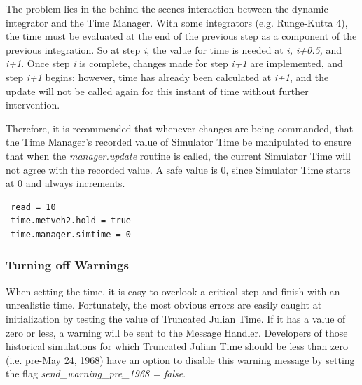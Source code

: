 The problem lies in the behind-the-scenes interaction between the dynamic integrator and the Time Manager.  With some integrators (e.g. Runge-Kutta 4), the time must be evaluated at the end of the previous step as a component of the previous integration.  So at step \textit{i}, the value for time is needed at \textit{i, i+0.5,} and \textit{i+1}.  Once step \textit{i} is complete, changes made for step \textit{i+1} are implemented, and step \textit{i+1} begins; however, time has already been calculated at \textit{i+1}, and the update will not be called again for this instant of time without further intervention.

Therefore, it is recommended that whenever changes are being commanded, that the Time Manager's recorded value of Simulator Time be manipulated to ensure that when the \textit{manager.update} routine is called, the current Simulator Time will not agree with the recorded value.  A safe value is 0, since Simulator Time starts at 0 and always increments.

\begin{verbatim}
 read = 10
 time.metveh2.hold = true
 time.manager.simtime = 0
\end{verbatim}

\subsubsection{Turning off Warnings}
When setting the time, it is easy to overlook a critical step and finish with an
unrealistic time.  Fortunately, the most obvious errors are easily caught at
initialization by testing the value of Truncated Julian Time.  If it has a value
of
zero or less, a warning will be sent to the Message Handler.  Developers of
those historical simulations for which Truncated Julian Time should be less than
zero (i.e. pre-May 24, 1968) have an option to disable this warning message by
setting the flag \textit{send\_warning\_pre\_1968 = false}.
